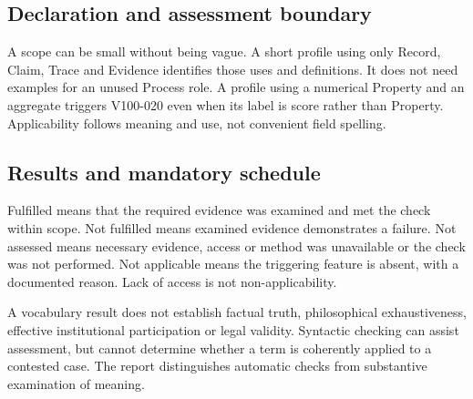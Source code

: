 \documentclass[11pt,a4paper]{article}
\begin{document}
\subsection{Declaration and assessment boundary}

A scope can be small without being vague. A short profile using only Record, Claim, Trace and Evidence identifies those uses and definitions. It does not need examples for an unused Process role. A profile using a numerical Property and an aggregate triggers V100-020 even when its label is score rather than Property. Applicability follows meaning and use, not convenient field spelling.

\subsection{Results and mandatory schedule}
Fulfilled means that the required evidence was examined and met the check within scope. Not fulfilled means examined evidence demonstrates a failure. Not assessed means necessary evidence, access or method was unavailable or the check was not performed. Not applicable means the triggering feature is absent, with a documented reason. Lack of access is not non-applicability.



A vocabulary result does not establish factual truth, philosophical exhaustiveness, effective institutional participation or legal validity. Syntactic checking can assist assessment, but cannot determine whether a term is coherently applied to a contested case. The report distinguishes automatic checks from substantive examination of meaning.
\end{document}
